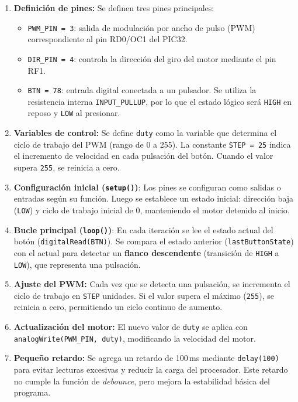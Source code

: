 \documentclass[a4paper,12pt]{article}
\begin{document}
\begin{enumerate}
    \item \textbf{Definición de pines:}  
    Se definen tres pines principales:
    \begin{itemize}
        \item \texttt{PWM\_PIN = 3}: salida de modulación por ancho de pulso (PWM) correspondiente al pin RD0/OC1 del PIC32.  
        \item \texttt{DIR\_PIN = 4}: controla la dirección del giro del motor mediante el pin RF1.  
        \item \texttt{BTN = 78}: entrada digital conectada a un pulsador. Se utiliza la resistencia interna \texttt{INPUT\_PULLUP}, por lo que el estado lógico será \texttt{HIGH} en reposo y \texttt{LOW} al presionar.
    \end{itemize}

    \item \textbf{Variables de control:}  
    Se define \texttt{duty} como la variable que determina el ciclo de trabajo del PWM (rango de 0 a 255).  
    La constante \texttt{STEP = 25} indica el incremento de velocidad en cada pulsación del botón.  
    Cuando el valor supera \texttt{255}, se reinicia a cero.

    \item \textbf{Configuración inicial (\texttt{setup()})}:  
    Los pines se configuran como salidas o entradas según su función.  
    Luego se establece un estado inicial: dirección baja (\texttt{LOW}) y ciclo de trabajo inicial de 0, manteniendo el motor detenido al inicio.

    \item \textbf{Bucle principal (\texttt{loop()})}:  
    En cada iteración se lee el estado actual del botón (\texttt{digitalRead(BTN)}).  
    Se compara el estado anterior (\texttt{lastButtonState}) con el actual para detectar un \textbf{flanco descendente} (transición de \texttt{HIGH} a \texttt{LOW}), que representa una pulsación.

    \item \textbf{Ajuste del PWM:}  
    Cada vez que se detecta una pulsación, se incrementa el ciclo de trabajo en \texttt{STEP} unidades.  
    Si el valor supera el máximo (\texttt{255}), se reinicia a cero, permitiendo un ciclo continuo de aumento.

    \item \textbf{Actualización del motor:}  
    El nuevo valor de \texttt{duty} se aplica con \texttt{analogWrite(PWM\_PIN, duty)}, modificando la velocidad del motor.

    \item \textbf{Pequeño retardo:}  
    Se agrega un retardo de 100\,ms mediante \texttt{delay(100)} para evitar lecturas excesivas y reducir la carga del procesador.  
    Este retardo no cumple la función de \textit{debounce}, pero mejora la estabilidad básica del programa.
\end{enumerate}
\end{document}
